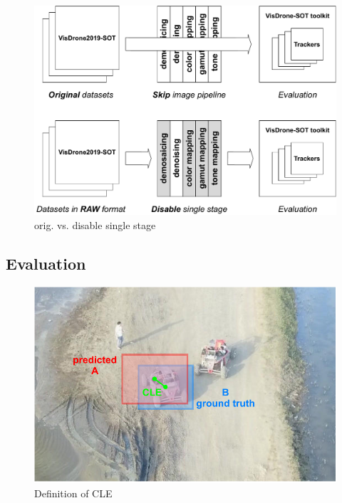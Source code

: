 \documentclass{beamer}
\begin{document}
\begin{frame}
    \begin{figure}[htpb]
        \begin{center}
            \includegraphics[width=0.8\linewidth]{fig/eva2.pdf}
            \caption{orig. vs. disable single stage}
        \end{center}
    \end{figure}
\end{frame}

\subsection{Evaluation}

\begin{frame}
    \begin{figure}[htpb]
        \begin{center}
            \includegraphics[width=0.8\linewidth]{fig/CLE.pdf}
            \caption{Definition of CLE}
        \end{center}
    \end{figure}
\end{frame}
\end{document}
